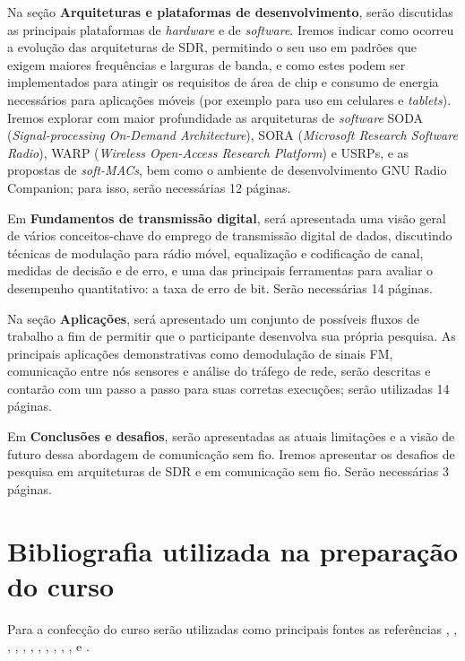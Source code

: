 \documentclass{SBCbookchapter}
\begin{document}
Na seção \textbf{Arquiteturas e plataformas de desenvolvimento}, serão discutidas as principais plataformas de \textit{hardware} e de \textit{software}. Iremos indicar como ocorreu a evolução das arquiteturas de SDR, permitindo o seu uso em padrões que exigem maiores frequências e larguras de banda, e como estes podem ser implementados para atingir os requisitos de área de chip e consumo de energia necessários para aplicações móveis (por exemplo para uso em celulares e {\it tablets}). Iremos explorar com maior profundidade as arquiteturas de \textit{software} SODA (\textit{Signal-processing On-Demand Architecture}), SORA (\textit{Microsoft Research Software Radio}), WARP (\textit{Wireless Open-Access Research Platform}) e USRPs, e as propostas de {\it soft-MACs}, bem como o ambiente de desenvolvimento GNU Radio Companion; para isso, serão necessárias 12 páginas.

Em \textbf{Fundamentos de transmissão digital}, será apresentada uma visão geral de vários conceitos-chave do emprego de transmissão digital de dados, discutindo técnicas de modulação para rádio móvel, equalização e codificação de canal, medidas de decisão e de erro, e uma das principais ferramentas para avaliar o desempenho quantitativo: a taxa de erro de bit. Serão necessárias 14 páginas.

Na seção \textbf{Aplicações}, será apresentado um conjunto de possíveis fluxos de trabalho a fim de permitir que o participante desenvolva sua própria pesquisa. As principais aplicações demonstrativas como demodulação de sinais FM, comunicação entre nós sensores e análise do tráfego de rede, serão descritas e contarão com um passo a passo para suas corretas execuções; serão utilizadas 14 páginas.

Em \textbf{Conclusões e desafios}, serão apresentadas as atuais limitações e a visão de futuro dessa abordagem de comunicação sem fio. Iremos apresentar os desafios de pesquisa em arquiteturas de SDR e em comunicação sem fio. Serão necessárias 3 páginas.


\section{Bibliografia utilizada na preparação do curso}

Para a confecção do curso serão utilizadas como principais fontes as referências \linebreak \cite{bhat2012design}, \cite{ulversoy2010software}, \cite{johnson2011software}, \cite{schmid2006gnu}, \linebreak \cite{de2012using}, \cite{a2011spectrum}, \cite{szalontai2010using}, \linebreak \cite{meshkova2011using}, \cite{murphy2006design}, \cite{yuan2006soda}, \cite{tan2011sora}, \linebreak \cite{zhang2011wireless} e \cite{wyglinski2013digital}.
\end{document}

